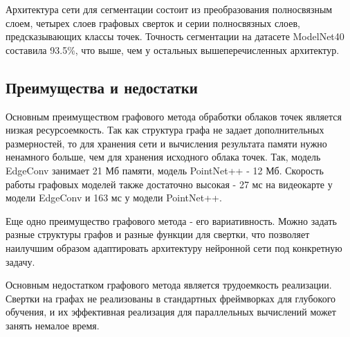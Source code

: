 \documentclass[]{article}
\begin{document}
Архитектура сети для сегментации состоит из преобразования полносвязным слоем, четырех слоев графовых сверток и серии полносвязных слоев, предсказывающих классы точек. Точность сегментации на датасете ModelNet40 составила 93.5\%, что выше, чем у остальных вышеперечисленных архитектур.

\subsection{Преимущества и недостатки}

Основным преимуществом графового метода обработки облаков точек является низкая ресурсоемкость. Так как структура графа не задает дополнительных размерностей, то для хранения сети и вычисления результата памяти нужно ненамного больше, чем для хранения исходного облака точек. Так, модель EdgeConv \cite{wang2019dynamic} занимает 21 Мб памяти, модель PointNet++ \cite{qi2017pointnet++} - 12 Мб. Скорость работы графовых моделей также достаточно высокая - 27 мс на видеокарте у модели EdgeConv и 163 мс у модели PointNet++.

Еще одно преимущество графового метода - его вариативность. Можно задать разные структуры графов и разные функции для свертки, что позволяет наилучшим образом адаптировать архитектуру нейронной сети под конкретную задачу.

Основным недостатком графового метода является трудоемкость реализации. Свертки на графах не реализованы в стандартных фреймворках для глубокого обучения, и их эффективная реализация для параллельных вычислений может занять немалое время.

\bigskip



\end{document}
